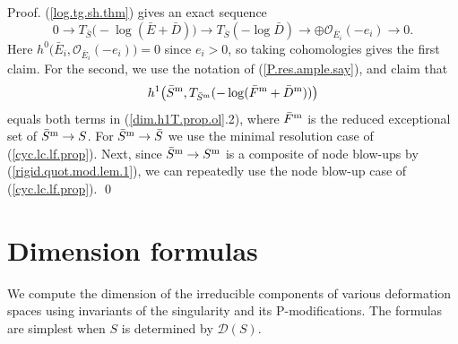 \documentclass{amsart}
\theoremstyle{definition}
\theoremstyle{remark}
\renewcommand{\o}[0]{{\mathcal O}}
\begin{document}
Proof.  
(\ref{log.tg.sh.thm}) gives an exact sequence
$$
0\to  T_{\bar S}\bigl(-\log ( \bar E+ \bar D)\bigr)\to
T_{\bar S}(-\log \bar D)\to \oplus \o_{\bar E_i}(-e_i)\to 0.
$$
Here $h^0\bigl(\bar E_i, \o_{\bar E_i}(-e_i)\bigr)=0$ since $e_i>0$, so taking cohomologies gives the first claim.
For the second, we use the notation of (\ref{P.res.ample.say}), and claim that
$$
h^1\bigl(\bar S^{\rm m}, T_{\bar S^{\rm m}}(-\log (\bar F^{\rm m}+\bar D^{\rm m}))\bigr)
$$
equals  both terms in (\ref{dim.h1T.prop.ol}.2), where $\bar F^{\rm m} $ is the reduced exceptional set of  $\bar S^{\rm m}\to   S$.
For $\bar S^{\rm m}\to  \bar S$ we use the minimal resolution case of (\ref{cyc.lc.lf.prop}).
Next, since  $\bar S^{\rm m}\to  S^{\rm m}$ is a composite of node blow-ups by (\ref{rigid.quot.mod.lem.1}), we can repeatedly use the
node blow-up case of (\ref{cyc.lc.lf.prop}).  \qed



\section{Dimension formulas}


We compute the dimension of the irreducible components of various deformation spaces using invariants of the singularity and its P-modifications.
The formulas are simplest when $S$ is determined by ${\mathcal D}(S)$. 
\end{document}
